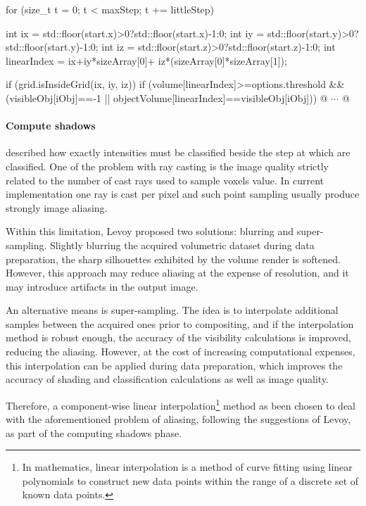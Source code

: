 \documentclass[12pt,a4paper]{extarticle}
\newcommand{\linespace}{\vspace{8pt}}
\begin{document}
\begin{cpp}[caption={Intensities classification loop with threshold test and object-wise classification.},label=code:classification]
for (size_t t = 0; t < maxStep; t += littleStep) {
	int ix = std::floor(start.x)>0?std::floor(start.x)-1:0;
	int iy = std::floor(start.y)>0?std::floor(start.y)-1:0;
	int iz = std::floor(start.z)>0?std::floor(start.z)-1:0;
	int linearIndex = ix+iy*sizeArray[0]+
			iz*(sizeArray[0]*sizeArray[1]);
		
	if (grid.isInsideGrid(ix, iy, iz)) {
		if (volume[linearIndex]>=options.threshold && 
			(visibleObj[iObj]==-1 || 
			 objectVolume[linearIndex]==visibleObj[iObj])) {
		@ $\cdots$ @
		}
	}
}
\end{cpp}

\paragraph{Compute shadows}
\cite{levoy_1988:4} described how exactly intensities must be classified beside the step at which are classified.
One of the problem with ray casting is the image quality strictly related to the number of cast rays used to sample voxels value. In current implementation one ray is cast per pixel and such point sampling usually produce strongly image aliasing.\cite{levoy_1988:4}

Within this limitation, Levoy proposed two solutions: blurring and super-sampling. Slightly blurring the acquired volumetric dataset during data preparation, the sharp silhouettes exhibited by the volume render is softened. However, this approach may reduce aliasing at the expense of resolution, and it may introduce artifacts in the output image.


An alternative means is super-sampling. The idea is to interpolate additional samples between the acquired ones prior to compositing, and if the interpolation method is robust enough, the accuracy of the visibility calculations is improved, reducing the aliasing. However, at the cost of increasing computational expenses, this interpolation can be applied during data preparation, which improves the accuracy of shading and classification calculations as well as image quality.


Therefore, a component-wise linear interpolation\footnote{In mathematics, linear interpolation is a method of curve fitting using linear polynomials to construct new data points within the range of a discrete set of known data points.} %
 method as been chosen to deal with the aforementioned problem of aliasing, following the suggestions of Levoy, as part of the computing shadows phase.
\linespace
\end{document}

